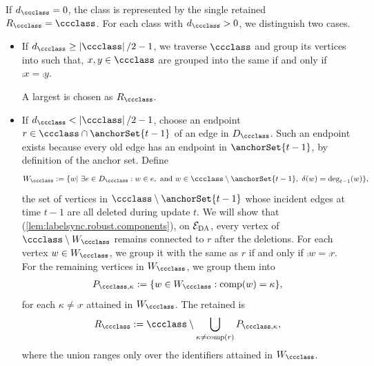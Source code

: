 If $ d_{\ccclass}=0 $, the class is represented by the single retained \piece{} $ \retainedPiece{\ccclass}=\ccclass $.
For each class with $ d_{\ccclass}>0 $, we distinguish two cases.
\begin{itemize}
    \item If $ d_{\ccclass}\ge\card{\ccclass}/2-1 $, we traverse $ \ccclass $ and group its vertices into  such that, $ x,y \in \ccclass $ are grouped into the same \piece{} if and only if $ \comp{x}=\comp{y} $.

    A largest \piece{} is chosen as $ \retainedPiece{\ccclass} $.
    \item If $ d_{\ccclass}<\card{\ccclass}/2-1 $, choose an endpoint $ r\in\ccclass\cap\anchorSet{t-1} $ of an edge in $ D_{\ccclass} $.
    Such an endpoint exists because every old edge has an endpoint in $ \anchorSet{t-1} $, by definition of the anchor set.
    Define
    \begin{align}
        W_{\ccclass}:=\{w|\ \exists e\in D_{\ccclass}: w\in e, \ \text{and }
        w \in \ccclass\setminus\anchorSet{t-1},\ \delIncEdge{w}=\deg_{t-1}(w)\}, \nonumber
    \end{align}
    the set of vertices in $ \ccclass\setminus \anchorSet{t-1} $ whose incident edges at time $ t-1 $ are all deleted during update $ t $. 
    We will show that (\cref{lem:labelsync.robust.components}), on $ \mathcal{E}_{\rm DA} $, every vertex of $ \ccclass\setminus W_{\ccclass} $ remains connected to $ r $ after the deletions.
    For each vertex $ w\in W_{\ccclass} $, we group it with the same \piece{} as $ r $ if and only if $ \comp{w}=\comp{r} $.
    For the remaining vertices in $ W_{\ccclass} $, we group them into 
    \begin{align}
        P_{\ccclass,\kappa}:=\{w\in W_{\ccclass}:\comp{w}=\kappa\}, \nonumber
    \end{align}
    for each $ \kappa\ne\comp{r} $ attained in $ W_{\ccclass} $.
    The retained \piece{} is
    \[
        \retainedPiece{\ccclass}:=\ccclass\setminus\bigcup_{\kappa\ne\comp{r}}P_{\ccclass,\kappa},
    \]
    where the union ranges only over the identifiers attained in $ W_{\ccclass} $.
\end{itemize}

